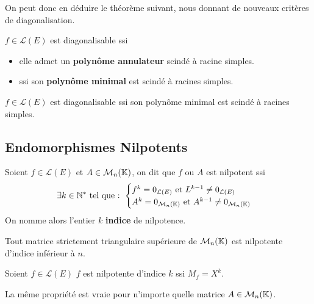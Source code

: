 On peut donc en déduire le théorème suivant, nous donnant de nouveaux critères de diagonalisation. 

\begin{theorem}
    $f \in \mathcal{L}(E)$ est diagonalisable ssi 
    \begin{itemize}
        \item elle admet un \textbf{polynôme annulateur} scindé à racine simples. 
        \item ssi son \textbf{polynôme minimal} est scindé à racines simples. 
    \end{itemize}
\end{theorem}

\begin{criteria}
    $f \in \mathcal{L}(E)$ est diagonalisable ssi son polynôme minimal est scindé à racines simples. 
\end{criteria}


\subsection{Endomorphismes Nilpotents}

\begin{definition}
    Soient $f \in \mathcal{L}(E)$ et $A \in \mathcal{M}_n(\mathbb{K})$, on dit que $f$ ou $A$ est nilpotent ssi 
        \[ \exists k \in \mathbb{N}^* \text{ tel que : }
            \begin{cases}
                f^k = 0_{\mathcal{L}(E)} \text{ et } L^{k-1} \not = 0_{\mathcal{L}(E)} \\ 
                A^k = 0_{\mathcal{M}_n(\mathbb{K})} \text{ et } A^{k-1} \not = 0_{\mathcal{M}_n(\mathbb{K})}
            \end{cases}
        \]
    On nomme alors l'entier $k$ \textbf{indice} de nilpotence. 
\end{definition}

\begin{prop}
    Tout matrice strictement triangulaire supérieure de $\mathcal{M}_n(\mathbb{K})$ est nilpotente d'indice inférieur à $n$. 
\end{prop}

\begin{prop}
    Soient $f \in \mathcal{L}(E)$ $f$ est nilpotente d'indice $k$ ssi $M_f = X^k$. 

    \vspace{0.3cm}

    La même propriété est vraie pour n'importe quelle matrice $A \in \mathcal{M}_n(\mathbb{K})$. 
\end{prop}


